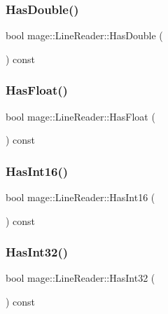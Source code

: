 \subsubsection{\texorpdfstring{Has\+Double()}{HasDouble()}}
{\footnotesize\ttfamily bool mage\+::\+Line\+Reader\+::\+Has\+Double (\begin{DoxyParamCaption}{ }\end{DoxyParamCaption}) const\hspace{0.3cm}{\ttfamily [protected]}}

\hypertarget{classmage_1_1_line_reader_ade0b6d83fc8cd6a4c64b2c97b9ff0bda}{}\label{classmage_1_1_line_reader_ade0b6d83fc8cd6a4c64b2c97b9ff0bda} 
\subsubsection{\texorpdfstring{Has\+Float()}{HasFloat()}}
{\footnotesize\ttfamily bool mage\+::\+Line\+Reader\+::\+Has\+Float (\begin{DoxyParamCaption}{ }\end{DoxyParamCaption}) const\hspace{0.3cm}{\ttfamily [protected]}}

\hypertarget{classmage_1_1_line_reader_a36b83e0adfa48d9226ae59c23df8f44a}{}\label{classmage_1_1_line_reader_a36b83e0adfa48d9226ae59c23df8f44a} 
\subsubsection{\texorpdfstring{Has\+Int16()}{HasInt16()}}
{\footnotesize\ttfamily bool mage\+::\+Line\+Reader\+::\+Has\+Int16 (\begin{DoxyParamCaption}{ }\end{DoxyParamCaption}) const\hspace{0.3cm}{\ttfamily [protected]}}

\hypertarget{classmage_1_1_line_reader_af8402b39637e27877eac2909604bbf89}{}\label{classmage_1_1_line_reader_af8402b39637e27877eac2909604bbf89} 
\subsubsection{\texorpdfstring{Has\+Int32()}{HasInt32()}}
{\footnotesize\ttfamily bool mage\+::\+Line\+Reader\+::\+Has\+Int32 (\begin{DoxyParamCaption}{ }\end{DoxyParamCaption}) const\hspace{0.3cm}{\ttfamily [protected]}}

